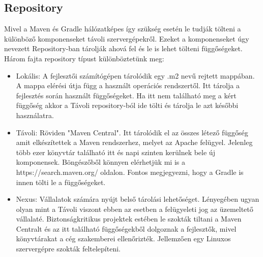 \documentclass{article}
\begin{document}
\subsection{Repository}\label{subsec:repo}
Mivel a Maven és Gradle hálózatképes így szükség esetén le tudják tölteni a különböző komponenseket távoli szervergépekről. Ezeket a komponenseket úgy nevezett Repository-ban tárolják ahová fel és le is lehet tölteni függőségeket. Három fajta repository típust különböztetünk meg: 
\begin{itemize}
	\item Lokális: A fejlesztői számítógépen tárolódik egy .m2 nevű rejtett mappában. A mappa elérési útja függ a használt operációs rendszertől. Itt tárolja a fejlesztés során használt függőségeket. Ha itt nem található meg a kért függőség akkor a Távoli repository-ból ide tölti és tárolja le azt későbbi használatra.
	\item Távoli: Röviden "Maven Central". Itt tárolódik el az összes létező függőség amit elkészítettek a Maven rendszerhez, melyet az Apache felügyel. Jelenleg több ezer könyvtár található itt és napi szinten kerülnek bele új komponensek. Böngészőből könnyen elérhetjük mi is a https://search.maven.org/ oldalon. Fontos megjegyezni, hogy a Gradle is innen tölti le a függőségeket.
	\item Nexus: Vállalatok számára nyújt belső tárolási lehetőséget. Lényegében ugyan olyan mint a Távoli viszont ebben az esetben a felügyeleti jog az üzemeltető vállalaté. Biztonságkritikus projektek estében le szokták tiltani a Maven Centralt és az itt található függőségekből dolgoznak a fejlesztők, mivel könyvtárakat a cég szakemberei ellenőrizték. Jellemzően egy Linuxos szervergépre szokták feltelepíteni.
\end{itemize}
\end{document}
